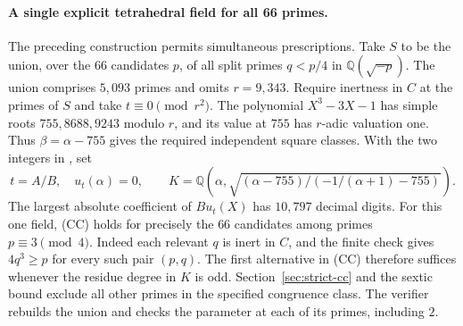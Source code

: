\paragraph{A single explicit tetrahedral field for all 66 primes.}
The preceding construction permits simultaneous prescriptions. Take
$S$ to be the union, over the $66$ candidates $p$, of all split primes
$q<p/4$ in $\mathbb Q(\sqrt{-p})$. The union comprises $5{,}093$ primes
and omits $r=9{,}343$. Require inertness in $C$ at the primes of $S$
and take $t\equiv0\pmod{r^2}$. The polynomial $X^3-3X-1$ has simple
roots $755,8688,9243$ modulo $r$, and its value at $755$ has $r$-adic
valuation one. Thus $\beta=\alpha-755$ gives the required independent
square classes. With the two integers in
, set
\[
 t=A/B,\quad u_t(\alpha)=0,\qquad
 K=\mathbb Q\!\left(\alpha,
    \sqrt{(\alpha-755)/(-1/(\alpha+1)-755)}\right).
\]
The largest absolute coefficient of $B u_t(X)$ has $10{,}797$ decimal
digits. For this one field, (CC) holds for precisely the $66$ candidates
among primes $p\equiv3\pmod4$. Indeed each relevant $q$ is inert in $C$,
and the finite check gives $4q^3\ge p$ for every such pair $(p,q)$.
The first alternative in (CC) therefore suffices whenever the residue
degree in $K$ is odd. Section~\ref{sec:strict-cc} and the sextic bound
exclude all other primes in the specified congruence class. The verifier
 rebuilds the union and checks the
parameter at each of its primes, including $2$.

